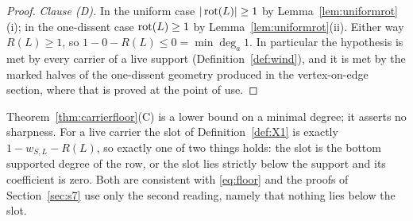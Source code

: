 \begin{proof}
\emph{Clause (D).} In the uniform case $|\operatorname{rot}(L)|\geq1$ by Lemma~\ref{lem:uniformrot}(i); in the
one-dissent case $\operatorname{rot}(L)\geq1$ by Lemma~\ref{lem:uniformrot}(ii). Either way
$R(L)\geq1$, so $1-0-R(L)\leq0=\min\deg_a1$. In particular the hypothesis is met by every carrier of a live support
(Definition~\ref{def:wind}), and it is met by the marked halves of the
one-dissent geometry produced in the vertex-on-edge section, where that is
proved at the point of use.
\end{proof}

\begin{remark}\label{rem:floorscope}
Theorem~\ref{thm:carrierfloor}(C) is a lower bound on a minimal degree; it asserts
no sharpness. For a live carrier the slot of Definition~\ref{def:X1} is exactly
$1-w_{S,L}-R(L)$, so exactly one of two things holds: the slot is the bottom
supported degree of the row, or the slot lies strictly below the support and its
coefficient is zero. Both are consistent with \eqref{eq:floor} and the proofs of
Section~\ref{sec:s7} use only the second reading, namely that nothing lies below
the slot.
\end{remark}

